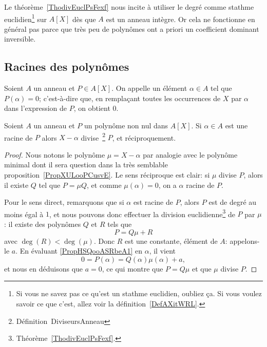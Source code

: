 \begin{normaltext}
    Le théorème~\ref{ThodivEuclPsFexf} nous incite à utiliser le degré comme stathme euclidien\footnote{Si vous ne savez pas ce qu'est un stathme euclidien, oubliez ça. Si vous voulez savoir ce que c'est, allez voir la définition~\ref{DefAXitWRL}.} sur \( A[X]\) dès que \( A\) est un anneau intègre. Or cela ne fonctionne en général pas parce que très peu de polynômes ont a priori un coefficient dominant inversible.
\end{normaltext}

\subsection{Racines des polynômes}

\begin{definition}
  Soient \( A \) un anneau et \( P \in A[X] \). On appelle
   un élément \( \alpha \in A \)
  tel que \( P(\alpha) = 0 \); c'est-à-dire que, en remplaçant toutes
  les occurrences de $X$ par $\alpha$ dans l'expression de $P$, on
  obtient $0$.
\end{definition}

\begin{proposition} \label{PropHSQooASRbeA}
    Soient \( A\) un anneau et \( P\) un polynôme non nul dans \( A[X]\). Si \( \alpha\in A\) est une racine de \( P\) alors \( X-\alpha\) divise~\footnote{Définition~{DiviseursAnneau}} \( P\), et réciproquement.
\end{proposition}

\begin{proof}
  Nous notons le polynôme \( \mu=X-\alpha\) par analogie avec le polynôme minimal dont il sera question dans la très semblable proposition~\ref{PropXULooPCusvE}. Le sens réciproque est clair: si $\mu$ divise $P$, alors il existe $Q$ tel que $P = \mu Q$, et comme $\mu(\alpha) = 0$, on a $\alpha$ racine de $P$.

  Pour le sens direct, remarquons que si $\alpha$ est racine de $P$, alors $P$ est de degré au moins égal à \( 1\), et nous pouvons donc effectuer la division euclidienne\footnote{Théorème~\ref{ThodivEuclPsFexf}.} de \( P\) par \( \mu\) : il existe des polynômes \( Q\) et \( R\) tels que
    \begin{equation} \label{PropHSQooASRbeA1}
        P=Q\mu+R
    \end{equation}
    avec \( \deg(R)<\deg(\mu)\). Donc \( R\) est une constante,
    élément de $A$: appelons-le $a$. En évaluant
    \eqref{PropHSQooASRbeA1} en \( \alpha\), il vient
    \begin{equation}
        0 = P(\alpha)=Q(\alpha)\mu(\alpha)+a,
    \end{equation}
    et nous en déduisons que \( a=0\), ce qui montre que \( P=Q\mu\) et que \( \mu\) divise \( P\).
\end{proof}

